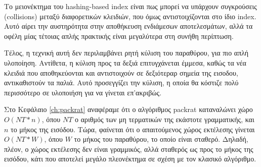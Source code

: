Το μειονέκτημα του hashing-based index είναι πως μπορεί να υπάρχουν συγκρούσεις (collisions) μεταξύ διαφορετικών κλειδιών, που όμως αντιστοιχίζονται στο ίδιο index.
Αυτό αίρει την αυστηρότητα στην αποθήκευση ενδιάμεσων αποτελεσμάτων, αλλά τα οφέλη μίας τέτοιας απλής πρακτικής είναι μεγαλύτερα στη συνήθη περίπτωση.

Τέλος, η τεχνική αυτή δεν περιλαμβάνει ρητή κύλιση του παραθύρου, για πιο απλή υλοποίηση.
Αντίθετα, η κύλιση προς τα δεξιά επιτυγχάνεται έμμεσα, καθώς τα νέα κλειδιά που αποθηκεύονται και αντιστοιχούν σε δεξιότεραρ σημεία της εισοδου, αντικαθιστούν τα παλιά.
Αυτό προσεγγίζει την κύλιση, η οποία θα κόστιζε πολύ περισσότερο σε υλοποιήση για να γίνεται επ'ακριβώς.

Στο Κεφάλαιο \ref{ch:packrat} αναφέραμε ότι ο αλγόριθμος packrat καταναλώνει χώρο $O(NT * n)$, όπου $NT$ ο αριθμός των μη τερματικών της εκάστοτε γραμματικής, και $n$ το μήκος της εισόδου. 
Τώρα, φαίνεται ότι ο απαιτούμενος χώρος εκτέλεσης γίνεται $O(NT * W)$, όπου $W$ το μήκος του παραθύρου, το οποίο είναι σταθερό.
Δηλαδή, πλέον, ο χώρος εκτέλεσης δεν είναι γραμμικός, αλλά σταθερός ως προς το μήκος της εισόδου, κάτι που αποτελεί μεγάλο πλεονέκτημα σε σχέση με τον κλασικό αλγόριθμο.
